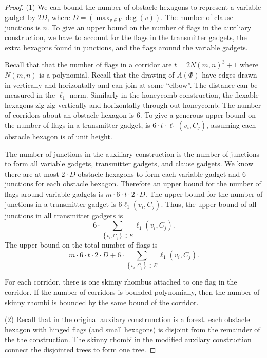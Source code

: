 \documentclass[10pt]{CSUNthesis}
\theoremstyle{plain}%
\theoremstyle{definition}
\theoremstyle{remark}
\newcommand{\lr}[1]{\left( #1 \right)}
\begin{document}
\begin{proof}
\noindent (1) We can bound the number of obstacle hexagons to represent a variable gadget by $2 D$, where $D = \lr{ \max_{v \in V} \deg (v)}$.  
The number of clause junctions is $n$.
To give an upper bound on the number of flags in the auxiliary construction, we have to account for the flags in the transmitter gadgets, the extra hexagons found in junctions, and the flags around the variable gadgets.

Recall that that the number of flags in a corridor are $ t = 2N(m,n)^3 + 1 $ where $N(m,n)$ is a polynomial. 
Recall that the drawing of $A(\Phi)$ have edges drawn in vertically and horizontally and can join at some ``elbow''.  
The distance can be measured in the $\ell_1$ norm.
Similarly in the honeycomb construction, the flexable hexagons zig-zig vertically and horizontally through out honeycomb.  
The number of corridors about an obstacle hexagon is $6$.
To give a generous upper bound on the number of flags in a transmitter gadget, is $6 \cdot t \cdot \ell_1\lr{v_i,C_j}$, assuming each obstacle hexagon is of unit height.

The number of junctions in the auxiliary construction is the number of junctions to form all variable gadgets, transmitter gadgets, and clause gadgets. 
We know there are at most $2 \cdot D$ obstacle hexagons to form each variable gadget and $6$ junctions for each obstacle hexagon.  
Therefore an upper bound for the number of flags around variable gadgets is $m \cdot 6 \cdot t \cdot 2 \cdot D$.
The upper bound for the number of junctions in a transmitter gadget is $6 \ell_1 \lr{v_i, C_j}$.  
Thus, the upper bound of all junctions in all transmitter gadgets is $$6 \cdot \sum_{\left\lbrace v_i, C_j \right\rbrace \in E} \ell_1 \lr{v_i, C_j}.$$
The upper bound on the total number of flags is
$$m \cdot 6 \cdot t \cdot 2 \cdot D + 6 \cdot \sum_{\left\lbrace v_i, C_j \right\rbrace \in E} \ell_1 \lr{v_i, C_j}.$$

For each corridor, there is one skinny rhombus attached to one flag in the corridor.  If the number of corridors is bounded polynomially, then the number of skinny rhombi is bounded by the same bound of the corridor.

\noindent (2) Recall that in the original auxilary construnction is a forest.
each obstacle hexagon with hinged flags (and small hexagons) is disjoint from the remainder of the the construction. 
The skinny rhombi in the modified auxilary construction connect the disjointed trees to form one tree.


\end{proof}
\end{document}
